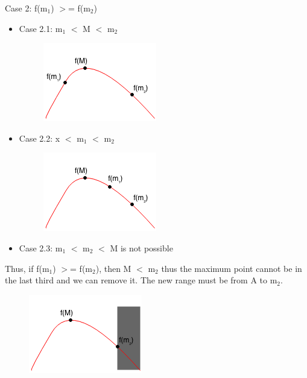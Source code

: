 \documentclass[11pt,oneside]{book}
\makeatletter
\def\maxwidth#1{\ifdim\Gin@nat@width>#1 #1\else\Gin@nat@width\fi}
\makeatother
\begin{document}
Case 2: f(m$_{1}$) $>$= f(m$_{2}$)

\begin{itemize}
\item Case 2.1: m$_{1}$ $<$ M $<$ m$_{2}$

\vspace{5px}\begin{figure}[H]\centering
        \includegraphics[width=0.66\maxwidth{\textwidth}]{ternarycase21.png}
        \end{figure}
\item Case 2.2: x $<$ m$_{1}$ $<$ m$_{2}$

\vspace{5px}\begin{figure}[H]\centering
        \includegraphics[width=0.66\maxwidth{\textwidth}]{ternarycase22.png}
        \end{figure}
\item Case 2.3: m$_{1}$ $<$ m$_{2}$ $<$ M is not possible
\end{itemize}

Thus, if f(m$_{1}$) $>$= f(m$_{2}$), then M $<$ m$_{2}$ thus the maximum point cannot be in the last third and we can remove it. The new range must be from A to m$_{2}$.

\vspace{5px}\begin{figure}[H]\centering
        \includegraphics[width=0.66\maxwidth{\textwidth}]{ternarycase2.png}
        \end{figure}
\end{document}
